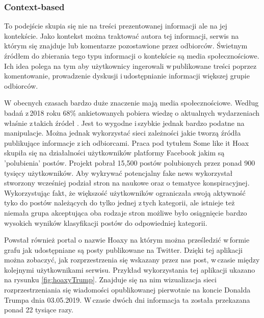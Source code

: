 \subsubsection{Context-based}
To podejście skupia się nie na treści prezentowanej informacji ale na jej kontekście. Jako kontekst można traktować autora tej informacji, serwis na którym się znajduje lub komentarze pozostawione przez odbiorców. Świetnym źródłem do zbierania tego typu informacji o kontekście są media społecznościowe. Ich idea polega na tym aby użytkownicy ingerowali w\,publikowane treści poprzez komentowanie, prowadzenie dyskusji i\,udostępnianie informacji większej grupie odbiorców.
\par
W obecnych czasach bardzo duże znaczenie mają media społecznościowe. Według badań z\,2018 roku 68\% ankietowanych pobiera wiedzę o aktualnych wydarzeniach właśnie z\,takich źródeł \cite{PewNewsUse2018}. Jest to wygodne i\,szybkie jednak bardzo podatne na manipulacje. Można jednak wykorzystać sieci zależności jakie tworzą źródła publikujące informacje z\,ich odbiorcami. Praca pod tytułem Some like it Hoax\cite{tacchini2017some} skupiła się na działalności użytkowników platformy Facebook jakim są ’polubienia’ postów. Projekt pobrał 15,500 postów polubionych przez ponad 900 tysięcy użytkowników. Aby wykrywać potencjalny fake news wykorzystał stworzony wcześniej podział stron na naukowe oraz o tematyce konspiracyjnej\cite{bessi2015science}. Wykorzystując fakt, że większość użytkowników ograniczała swoją aktywność tyko do postów należących do tylko jednej z\,tych kategorii, ale istnieje też niemała grupa akceptująca oba rodzaje stron możliwe było osiągnięcie bardzo wysokich wyników klasyfikacji postów do odpowiedniej kategorii. 
\par
Powstał również portal o nazwie Hoaxy\cite{shao2016hoaxy} na którym można prześledzić w\,formie grafu jak udostępniane są posty publikowane na Twitter. Dzięki tej aplikacji można zobaczyć, jak rozprzestrzenia się wskazany przez nas post, w\,czasie między kolejnymi użytkownikami serwisu. Przykład wykorzystania tej aplikacji ukazano na rysunku \ref{fig:hoaxyTrump}. Znajduje się na nim wizualizacja sieci rozprzestrzeniania się wiadomości opublikowanej pierwotnie na koncie Donalda Trumpa dnia 03.05.2019. W\,czasie dwóch dni informacja ta została przekazana ponad 22 tysiące razy.
